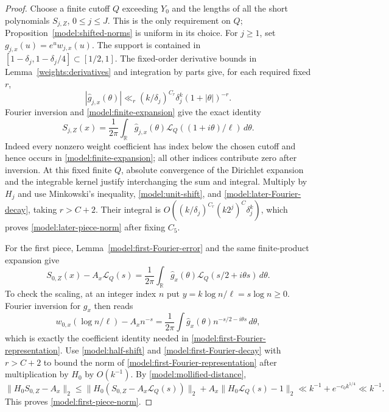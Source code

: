 \begin{proof}
Choose a finite cutoff $Q$ exceeding $Y_0$ and the lengths of all the
short polynomials $S_{j,Z}$, $0\le j\le J$.  This is the only
requirement on $Q$; Proposition~\ref{model:shifted-norms} is uniform
in its choice.
For $j\ge1$, set $g_{j,x}(u)=e^u w_{j,x}(u)$.  The support is
contained in
$[1-\delta_j,1-\delta_j/4]\subset[1/2,1]$.
The fixed-order derivative bounds in Lemma~\ref{weights:derivatives}
and integration by parts give, for each required fixed $r$,
\begin{equation}
 |\widehat g_{j,x}(\theta)|
 \ll_r (k/\delta_j)^{C_r}\delta_j^k(1+|\theta|)^{-r}.
 \label{model:later-Fourier-decay}
\end{equation}
Fourier inversion and \eqref{model:finite-expansion} give the exact
identity
\begin{equation}
 S_{j,Z}(x)=\frac1{2\pi}\int_{\mathbb R}
      \widehat g_{j,x}(\theta)
      \mathcal L_Q((1+i\theta)/\ell)\,d\theta.
 \label{model:later-Fourier-representation}
\end{equation}
Indeed every nonzero weight coefficient has index below the chosen
cutoff and hence occurs in \eqref{model:finite-expansion}; all other
indices contribute zero after inversion.  At this fixed finite $Q$,
absolute convergence of the Dirichlet expansion and the integrable
kernel justify interchanging the sum and integral.  Multiply by $H_j$
and use Minkowski's inequality, \eqref{model:unit-shift}, and
\eqref{model:later-Fourier-decay}, taking $r>C+2$.  Their integral
is $O((k/\delta_j)^{C_r}(k2^j)^C\delta_j^k)$, which proves
\eqref{model:later-piece-norm} after fixing $C_5$.

For the first piece, Lemma~\ref{model:first-Fourier-error} and the
same finite-product expansion give
\begin{equation}
 S_{0,Z}(x)-A_x\mathcal L_Q(s)
 =\frac1{2\pi}\int_{\mathbb R}\widehat g_x(\theta)
                    \mathcal L_Q(s/2+i\theta s)\,d\theta.
 \label{model:first-Fourier-representation}
\end{equation}
To check the scaling, at an integer index $n$ put
$y=k\log n/\ell=s\log n\ge0$.  Fourier inversion for $g_x$ then
reads
\[
 w_{0,x}(\log n/\ell)-A_x n^{-s}
 =\frac1{2\pi}\int\widehat g_x(\theta)
                          n^{-s/2-i\theta s}\,d\theta,
\]
which is exactly the coefficient identity needed in
\eqref{model:first-Fourier-representation}.
Use \eqref{model:half-shift} and
\eqref{model:first-Fourier-decay} with $r>C+2$ to bound the norm of
\eqref{model:first-Fourier-representation} after multiplication by
$H_0$ by $O(k^{-1})$.  By \eqref{model:mollified-distance},
\[
 \|H_0S_{0,Z}-A_x\|_2
 \le \|H_0(S_{0,Z}-A_x\mathcal L_Q(s))\|_2
        +A_x\|H_0\mathcal L_Q(s)-1\|_2
 \ll k^{-1}+e^{-c_0k^{1/4}}\ll k^{-1}.
\]
This proves \eqref{model:first-piece-norm}.


\end{proof}

